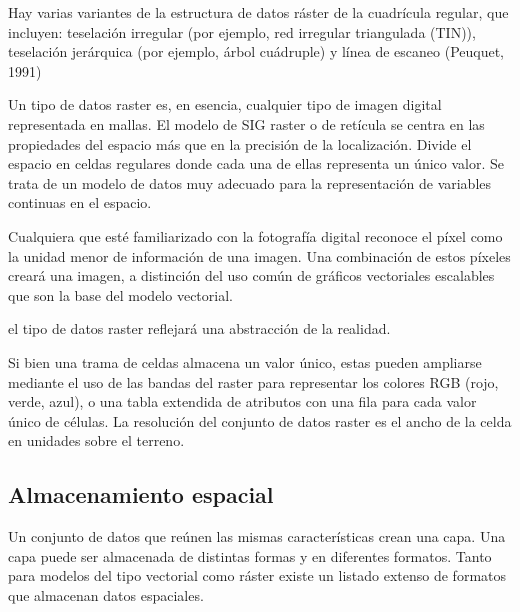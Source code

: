 
Hay varias variantes de la estructura de datos ráster de la cuadrícula regular, que incluyen: teselación irregular (por ejemplo, red irregular triangulada (TIN)), teselación jerárquica (por ejemplo, árbol cuádruple) y línea de escaneo (Peuquet, 1991)

Un tipo de datos raster es, en esencia, cualquier tipo de imagen digital representada en mallas. El modelo de SIG raster o de retícula se centra en las propiedades del espacio más que en la precisión de la localización. Divide el espacio en celdas regulares donde cada una de ellas representa un único valor. Se trata de un modelo de datos muy adecuado para la representación de variables continuas en el espacio.

Cualquiera que esté familiarizado con la fotografía digital reconoce el píxel como la unidad menor de información de una imagen. Una combinación de estos píxeles creará una imagen, a distinción del uso común de gráficos vectoriales escalables que son la base del modelo vectorial. 

el tipo de datos raster reflejará una abstracción de la realidad. 

Si bien una trama de celdas almacena un valor único, estas pueden ampliarse mediante el uso de las bandas del raster para representar los colores RGB (rojo, verde, azul), o una tabla extendida de atributos con una fila para cada valor único de células. La resolución del conjunto de datos raster es el ancho de la celda en unidades sobre el terreno.

\subsection{Almacenamiento espacial}

Un conjunto de datos que reúnen las mismas características crean una capa. Una capa puede ser almacenada de distintas formas y en diferentes formatos. Tanto para modelos del tipo vectorial como ráster existe un listado extenso de formatos que almacenan datos espaciales.

